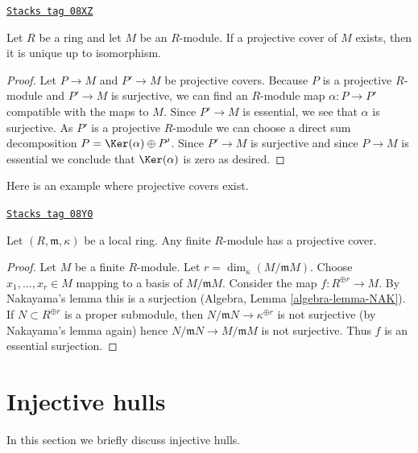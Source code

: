 \begin{lemma}
\label{dualizing-lemma-projective-cover-unique}
\href{https://stacks.math.columbia.edu/tag/08XZ}{\texttt{Stacks tag 08XZ}}

Let $R$ be a ring and let $M$ be an $R$-module. If a projective cover
of $M$ exists, then it is unique up to isomorphism.
\end{lemma}

\begin{proof}
Let $P \to M$ and $P' \to M$ be projective covers. Because $P$ is a
projective $R$-module and $P' \to M$ is surjective, we can find an
$R$-module map $\alpha : P \to P'$ compatible with the maps to $M$.
Since $P' \to M$ is essential, we see that $\alpha$ is surjective.
As $P'$ is a projective $R$-module we can choose a direct sum decomposition
$P = \Ker(\alpha) \oplus P'$. Since $P' \to M$ is surjective
and since $P \to M$ is essential we conclude that $\Ker(\alpha)$
is zero as desired.
\end{proof}

Here is an example where projective covers exist.

\begin{lemma}
\label{dualizing-lemma-projective-covers-local}
\href{https://stacks.math.columbia.edu/tag/08Y0}{\texttt{Stacks tag 08Y0}}

Let $(R, \mathfrak m, \kappa)$ be a local ring. Any finite $R$-module has
a projective cover.
\end{lemma}

\begin{proof}
Let $M$ be a finite $R$-module. Let $r = \dim_\kappa(M/\mathfrak m M)$.
Choose $x_1, \ldots, x_r \in M$ mapping to a basis of $M/\mathfrak m M$.
Consider the map $f : R^{\oplus r} \to M$. By Nakayama's lemma this is
a surjection (Algebra, Lemma \ref{algebra-lemma-NAK}). If
$N \subset R^{\oplus r}$ is a proper submodule, then
$N/\mathfrak m N \to \kappa^{\oplus r}$ is not surjective (by
Nakayama's lemma again) hence $N/\mathfrak m N \to M/\mathfrak m M$
is not surjective. Thus $f$ is an essential surjection.
\end{proof}

\section{Injective hulls}
\label{dualizing-section-injective-hull}
In this section we briefly discuss injective hulls.


